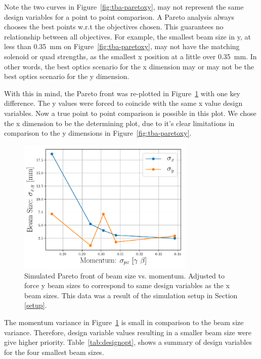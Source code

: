 Note the two curves in Figure~\ref{fig:tba-paretoxy}, may not represent the same 
design variables for a point to point comparison. A Pareto analysis always 
chooses the best points w.r.t the objectives chosen. This guarantees no 
relationship between all objectives. 
For example, the smallest beam size in y, at less than \SI{0.35}{mm} on Figure~\ref{fig:tba-paretoxy}, 
may not have the matching solenoid or quad strengths, as the smallest x position 
at a little over \SI{0.35}{mm}. In other words, the best optics scenario for the x dimension
may or may not be the best optics scenario for the y dimension. 

With this in mind, the Pareto front was re-plotted in Figure~\ref{fig:tba-paretoxonly} 
with one key difference. The y values were forced to coincide with the same 
x value design variables. Now a true point to point comparison is possible in this plot.
We chose the x dimension to be the determining plot, 
due to it's clear limitations in comparison to the y dimensions in Figure~\ref{fig:tba-paretoxy}. 
\begin{figure}
	\centering
	\includegraphics[width=0.75\textwidth]{./images/xonly_pareto_front_quads_before_Q5}
	\caption{Simulated Pareto front of beam size vs. momentum.
		Adjusted to force y beam sizes to correspond to same design variables 
		as the x beam sizes.
		This data was a result of the simulation setup in Section \ref{setup}.}
	\label{fig:tba-paretoxonly}
\end{figure}
The momentum variance in Figure~\ref{fig:tba-paretoxonly} is small in comparison to 
the beam size variance. Therefore, design variable values resulting in a smaller 
beam size were give higher priority. Table~\ref{tab:designopt}, shows a summary of 
design variables for the four smallest beam sizes.
